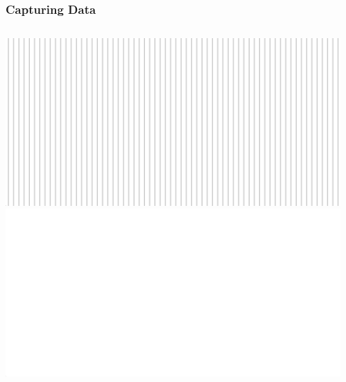 \documentclass[landscape,xcolor={table}]{beamer}
\begin{document}
	\begin{frame}
		
		\frametitle{Capturing Data}
		
		\begin{columns}[T] %
		\begin{column}{.49\textwidth}

			\includegraphics[width=\textwidth]{images/selftest_plus} \\
			\includegraphics[width=\textwidth]{images/stims_zero}
			
		\end{column}%
		\hfill%
		\begin{column}{.49\textwidth}
		
		\end{column}%
		\end{columns}
		

	\end{frame}
	
\end{document}
